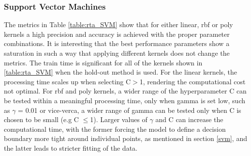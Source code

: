 \documentclass{article}
\begin{document}
\subsubsection*{Support Vector Machines}
The metrics in Table \ref{table:rta_SVM} show that for either linear, rbf or poly kernels a high precision and accuracy is achieved with the proper parameter combinations. It is interesting that the best performance parameters show a saturation in such a way that applying different kernels does not change the metrics. The train time is significant for all of the kernels shown in \ref{table:rta_SVM} when the hold-out method is used. For the linear kernels, the processing time scales up when selecting C$>$1, rendering the computational cost not optimal. For rbf and poly kernels, a wider range of the hyperparameter C can be tested within a meaningful processing time, only when gamma is set low, such as $\gamma$ = 0.01 or vice-verca, a wider range of gamma can be tested only when C is chosen to be small (e.g C $\le$1). Larger values of $\gamma$ and C can increase the computational time, with the former forcing the model to define a decision boundary more tight around individual points, as mentioned in section \ref{svm}, and the latter leads to stricter fitting of the data. 
\\ 
 
\end{document}
